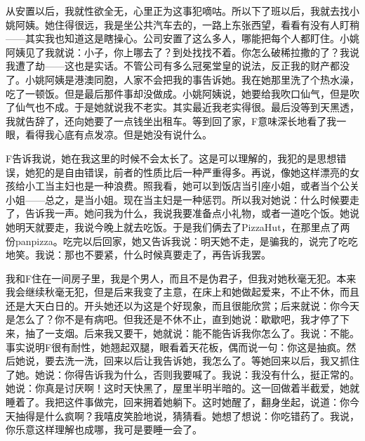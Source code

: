 从安置以后，我就性欲全无，心里正为这事犯嘀咕。所以下了班以后，我就去找小姚阿姨。她住得很远，我是坐公共汽车去的，一路上东张西望，看看有没有人盯稍——其实我也知道这是瞎操心。公司安置了这么多人，哪能把每个人都盯住。小姚阿姨见了我就说：小子，你上哪去了？到处找找不着。你怎么破稀拉撒的了？我说我遭了劫——这也是实话。不管公司有多么冠冕堂皇的说法，反正我的财产都没了。小姚阿姨是港澳同胞，人家不会把我的事告诉她。我在她那里洗了个热水澡，吃了一顿饭。但是最后那件事却没做成。小姚阿姨说，她要给我吹口仙气，但是吹了仙气也不成。于是她就说我不老实。其实最近我老实得很。最后没等到天黑透，我就告辞了，还向她要了一点钱坐出租车。等到回了家，F意味深长地看了我一眼，看得我心底有点发凉。但是她没有说什么。 

F告诉我说，她在我这里的时候不会太长了。这是可以理解的，我犯的是思想错误，她犯的是自由错误，前者的性质比后一种严重得多。再说，像她这样漂亮的女孩给小工当主妇也是一种浪费。照我看，她可以到饭店当引座小姐，或者当个公关小姐——总之，是当小姐。现在当主妇是一种惩罚。所以我对她说：什么时候要走了，告诉我一声。她问我为什么，我说我要准备点小礼物，或者一道吃个饭。她说她明天就要走，我说今晚上就去吃饭。于是我们俩去了PizzaHut，在那里点了两份panpizza。吃完以后回家，她又告诉我说：明天她不走，是骗我的，说完了吃吃地笑。我说：那也不要紧，什么时候真要走了，再告诉我罢。 

我和F住在一间房子里，我是个男人，而且不是伪君子，但我对她秋毫无犯。本来我会继续秋毫无犯，但是后来我变了主意，在床上和她做起爱来，不止不休，而且还是大天白日的。开头她还以为这是个好现象，而且很能欣赏；后来就说：你今天是怎么了？你不是有病吧。但我还是不休不止，直到她说：歇歇吧，我才停了下来，抽了一支烟。后来我又要干，她就说：能不能告诉我你怎么了。我说：不能。事实说明F很有耐性，她翘起双腿，眼看着天花板，偶而说一句：你这是抽疯。然后她说，要去洗一洗，回来以后让我告诉她，我怎么了。等她回来以后，我又抓住了她。她说：你得告诉我为什么，否则我要喊了。我说：我没有什么，挺正常的。她说：你真是讨厌啊！这时天快黑了，屋里半明半暗的。这一回做着半截爱，她就睡着了。我把这件事做完，回来拥着她躺下。这时她醒了，翻身坐起，说道：你今天抽得是什么疯啊？我嘻皮笑脸地说，猜猜看。她想了想说：你吃错药了。我说，你乐意这样理解也成哪，我可是要睡一会了。 

